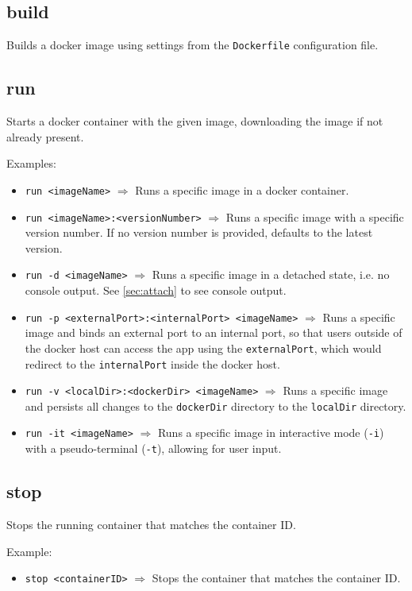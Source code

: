\documentclass[a4paper, 12pt]{article}
\begin{document}
\subsection{build}

Builds a docker image using settings from the \texttt{Dockerfile} configuration
file.

\subsection{run}

Starts a docker container with the given image, downloading the image if not
already present.

\vspace{0.5em}
Examples:
\begin{itemize}
	\item \texttt{run <imageName>} $\Rightarrow$ Runs a specific image
	in a docker container.
	\item \texttt{run <imageName>:<versionNumber>} $\Rightarrow$ Runs a specific
	image with a specific version number. If no version number is provided,
	defaults to the latest version.
	\item \texttt{run -d <imageName>} $\Rightarrow$ Runs a specific image in a
	detached state, i.e. no console output. See \ref{sec:attach} to see console
	output.
	\item \texttt{run -p <externalPort>:<internalPort> <imageName>}
	$\Rightarrow$ Runs a specific image and binds an external port to an
	internal port, so that users outside of the docker host can access the app
	using the \texttt{externalPort}, which would redirect to the
	\texttt{internalPort} inside the docker host.
	\item \texttt{run -v <localDir>:<dockerDir> <imageName>} $\Rightarrow$ Runs
	a specific image and persists all changes to the \texttt{dockerDir}
	directory to the \texttt{localDir} directory.
	\item \texttt{run -it <imageName>} $\Rightarrow$ Runs a specific image in
	interactive mode (\texttt{-i}) with a pseudo-terminal (\texttt{-t}),
	allowing for user input.
\end{itemize}

\subsection{stop}

Stops the running container that matches the container ID.

\vspace{0.5em}
Example:
\begin{itemize}
	\item \texttt{stop <containerID>} $\Rightarrow$ Stops the container that
	matches the container ID.
\end{itemize}
\end{document}
